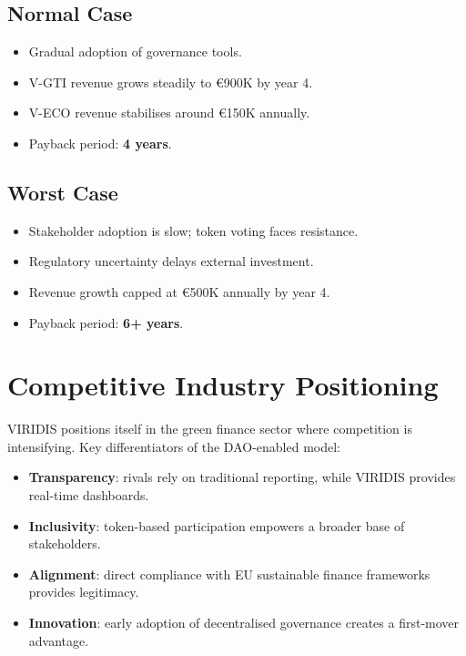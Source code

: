 \documentclass[
  english,
  12pt,
  oneside,
  open=any]{scrbook}
\providecommand{\tightlist}{%
  \setlength{\itemsep}{0pt}\setlength{\parskip}{0pt}}\usepackage{longtable,booktabs,array}
\begin{document}
\subsection{Normal Case}\label{sec-normal}

\begin{itemize}
\tightlist
\item
  Gradual adoption of governance tools.\\
\item
  V-GTI revenue grows steadily to €900K by year 4.\\
\item
  V-ECO revenue stabilises around €150K annually.\\
\item
  Payback period: \textbf{4 years}.
\end{itemize}

\subsection{Worst Case}\label{sec-worst}

\begin{itemize}
\tightlist
\item
  Stakeholder adoption is slow; token voting faces resistance.\\
\item
  Regulatory uncertainty delays external investment.\\
\item
  Revenue growth capped at €500K annually by year 4.\\
\item
  Payback period: \textbf{6+ years}.
\end{itemize}

\section{Competitive Industry Positioning}\label{sec-competitive}

VIRIDIS positions itself in the green finance sector where competition
is intensifying. Key differentiators of the DAO-enabled model:

\begin{itemize}
\tightlist
\item
  \textbf{Transparency}: rivals rely on traditional reporting, while
  VIRIDIS provides real-time dashboards.\\
\item
  \textbf{Inclusivity}: token-based participation empowers a broader
  base of stakeholders.\\
\item
  \textbf{Alignment}: direct compliance with EU sustainable finance
  frameworks provides legitimacy.\\
\item
  \textbf{Innovation}: early adoption of decentralised governance
  creates a first-mover advantage.
\end{itemize}
\end{document}
